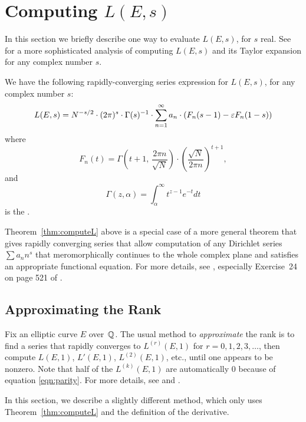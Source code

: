 \section{Computing $L(E,s)$}
In this section we briefly describe one way to evaluate $L(E,s)$,
for $s$ real.   See \cite{dokchitser:lfun} for a more sophisticated
analysis of computing $L(E,s)$ and its Taylor expansion for any
complex number $s$.

\begin{theorem}[Lavrik]\label{thm:computeL}
We have the following
rapidly-converging series expression for $L(E,s)$, for any 
complex number $s$:
$$
L(E,s) = N^{-s/2}\cdot (2\pi)^s\cdot  \Gamma(s)^{-1}\cdot
\sum_{n=1}^{\infty} a_n \cdot \left(F_n(s-1) - \varepsilon F_n(1-s)\right)
$$
where
$$
  F_n(t) = 
           \Gamma\left(t+1,\, \frac{2\pi n}{\sqrt{N}}\right)
\cdot \left(\frac{\sqrt{N}}{2\pi n}\right)^{t+1},
$$
and
$$
  \Gamma(z,\alpha) = \int_{\alpha}^{\infty} t^{z-1} e^{-t}dt
$$
is the .
\end{theorem}

Theorem~\ref{thm:computeL} above is a special case of a more
general theorem that gives rapidly converging series
that allow computation of any Dirichlet series $\sum a_n n^s$
that meromorphically continues to the whole complex plane and
satisfies an appropriate functional equation.  
For more details, see \cite[\S10.3]{cohen:advanced},
especially Exercise~24 on page 521 of \cite{cohen:advanced}.


\subsection{Approximating the Rank}
Fix an elliptic curve $E$ over~$\mathbb{Q}$.  The usual method to {\em
  approximate} the rank is to find a series that rapidly converges to
$L^{(r)}(E,1)$ for $r=0,1,2,3,\ldots$, then compute $L(E,1)$,
$L'(E,1)$, $L^{(2)}(E,1)$, etc., until one appears to be nonzero. 
Note that half of the $L^{(k)}(E,1)$ are automatically $0$
because of equation \eqref{eqn:parity}.
For more details, see \cite[\S2.13]{cremona:algs}
and \cite{dokchitser:lfun}. 

In this section, we describe a slightly different method, which only
uses Theorem~\ref{thm:computeL} and the definition of the derivative.


